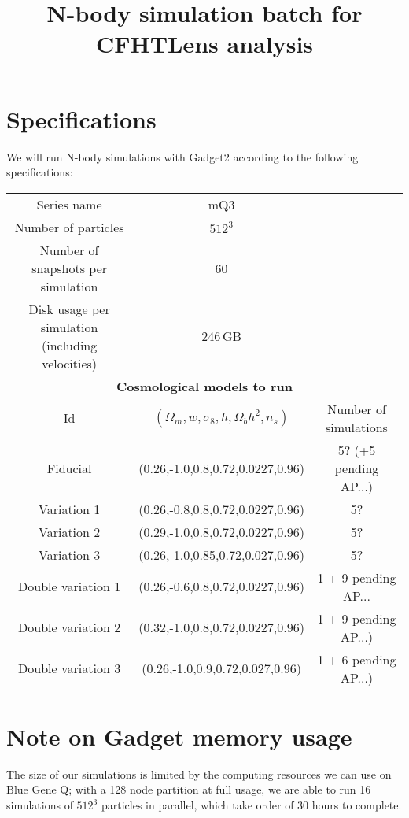 \documentclass[11pt]{article}
\begin{document}
\title{N-body simulation batch for CFHTLens analysis}
\author{}
\date{}

\maketitle

\section*{Specifications}

We will run N-body simulations with Gadget2 according to the following specifications:

\begin{table}[h!]
\begin{center}
\begin{tabular}{ccc} \hline
Series name & mQ3 & \\
Number of particles & $512^3$ & \\ 
Number of snapshots per simulation & 60 & \\
Disk usage per simulation (including velocities) & 246\,GB& \\ \hline
\multicolumn{3}{c}{\textbf{Cosmological models to run}} \\
Id & $(\Omega_m,w,\sigma_8,h,\Omega_bh^2,n_s)$ & Number of simulations\\ \hline
Fiducial & (0.26,-1.0,0.8,0.72,0.0227,0.96) & 5? (+5 pending AP...) \\
Variation 1 & (0.26,-0.8,0.8,0.72,0.0227,0.96) & 5? \\
Variation 2 & (0.29,-1.0,0.8,0.72,0.0227,0.96) & 5? \\
Variation 3 & (0.26,-1.0,0.85,0.72,0.027,0.96) & 5? \\ \hline
Double variation 1 & (0.26,-0.6,0.8,0.72,0.0227,0.96) & 1 + 9 pending AP... \\
Double variation 2 & (0.32,-1.0,0.8,0.72,0.0227,0.96) & 1 + 9 pending AP...) \\
Double variation 3 & (0.26,-1.0,0.9,0.72,0.027,0.96) & 1 + 6 pending AP...) \\ \hline
\end{tabular}
\end{center}
\end{table}

\section*{Note on Gadget memory usage}
The size of our simulations is limited by the computing resources we can use on Blue Gene Q; with a 128 node partition at full usage, we are able to run 16 simulations of $512^3$ particles in parallel, which take order of 30 hours to complete. 
\end{document}
